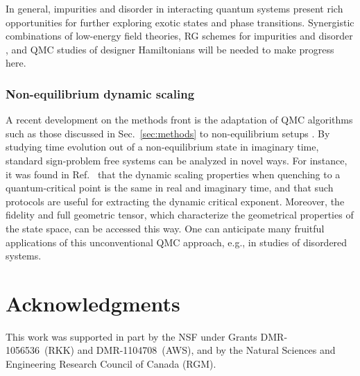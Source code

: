 \documentclass[10pt,pre,aps,twocolumn,showpacs,subscriptaddresses,floatfix]{revtex4}
\begin{document}
In general, impurities and disorder in interacting quantum systems present rich opportunities for further exploring exotic states and phase transitions.
Synergistic combinations of low-energy field theories, RG schemes for impurities \cite{Vojta12} and disorder \cite{Hoyos08,Vojta10,Altman10,Iyer12}, 
and QMC studies of designer Hamiltonians will be needed to make progress here.

\subsubsection{Non-equilibrium dynamic scaling}

A recent development on the methods front is the adaptation of QMC algorithms such as those discussed in Sec.~\ref{sec:methods} to non-equilibrium 
setups \cite{Degrandi11}. By studying time evolution out of a non-equilibrium state in imaginary time, standard sign-problem free systems
can be analyzed in novel ways. For instance, it was found in Ref.~\cite{Degrandi11} that the dynamic scaling properties when quenching to
a quantum-critical point is the same in real and imaginary time, and that such protocols are useful for extracting the dynamic critical
exponent. Moreover, the fidelity and full geometric tensor, which characterize the geometrical properties of the state space, can be
accessed this way. One can anticipate many fruitful applications of this unconventional QMC approach, e.g., in studies of disordered systems.

\section*{Acknowledgments}

This work was supported in part by the NSF under Grants DMR-1056536~(RKK) and DMR-1104708~(AWS), and by the Natural Sciences and Engineering Research Council of Canada (RGM).


\end{document}
